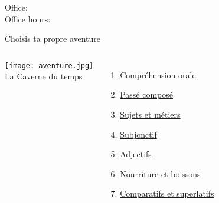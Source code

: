 \documentclass{beamer}
\subtitle[Révision: Examen 2]{Révision de l'examen 2}
\begin{document}
  \begin{frame}
    \titlepage
    \tiny{Office: \\
          Office hours: }
  \end{frame}

  \begin{frame}{Choisis ta propre aventure \\ }
    \hypertarget{début}{}
    \begin{columns}
        \begin{center}
          \texttt{[image: aventure.jpg]} \\
          La Caverne du temps
        \end{center}
        \begin{enumerate}
          \item \hyperlink{orale}{Compréhension orale} %
          \item \hyperlink{mort}{Passé composé}
          \item \hyperlink{sujets}{Sujets et métiers}
          \item \hyperlink{mort}{Subjonctif}
          \item \hyperlink{adjectifs}{Adjectifs}
          \item \hyperlink{mort}{Nourriture et boissons}
          \item \hyperlink{comparatifs}{Comparatifs et superlatifs}
        \end{enumerate}
    \end{columns}
  \end{frame}

\end{document}
